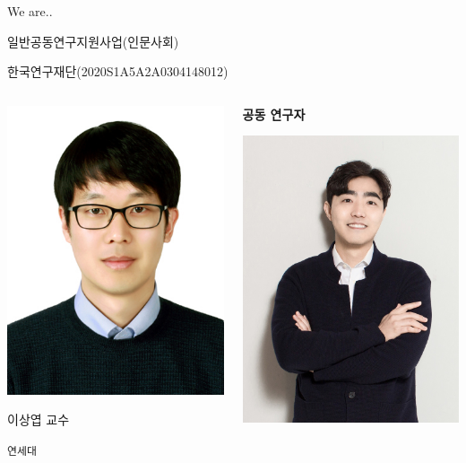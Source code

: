 \documentclass[
  ignorenonframetext,
]{beamer}
\begin{document}
\begin{frame}[fragile]{We are..}
\begin{block}{일반공동연구지원사업(인문사회)}
\begin{block}{한국연구재단(2020S1A5A2A0304148012)}
\begin{columns}[T]
\begin{column}{0.18\textwidth}
\includegraphics[width=3.125in,height=\textheight]{img/lsy.jpg}

\begin{block}{이상엽 교수}
\protect\hypertarget{uxc774uxc0c1uxc5fd-uxad50uxc218}{}
\end{block}

\begin{block}{\texttt{연세대}}
\protect\hypertarget{uxc5f0uxc138uxb300}{}
\end{block}
\end{column}

\begin{column}{0.18\textwidth}
\textbf{공동 연구자}

\includegraphics[width=3.125in,height=\textheight]{img/cj.jpg}


\end{column}
\end{columns}
\end{block}
\end{block}
\end{frame}
\end{document}
